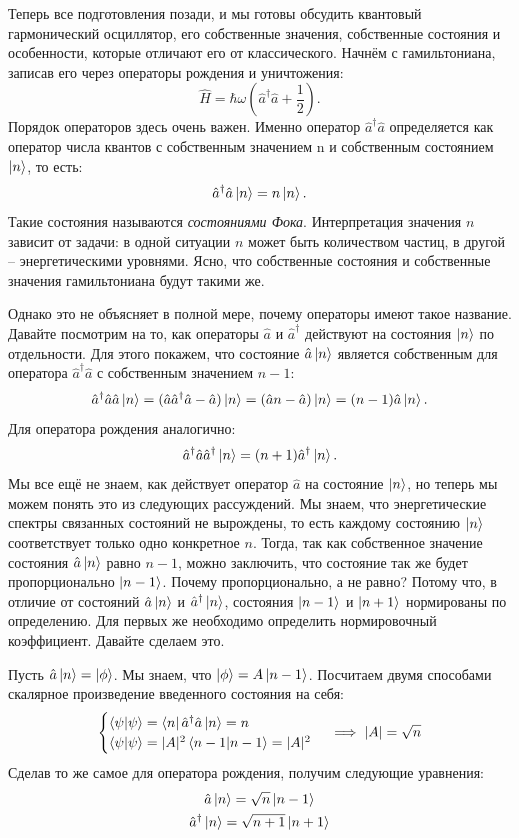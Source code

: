Теперь все подготовления позади, и мы готовы обсудить квантовый гармонический осциллятор, его собственные значения, собственные состояния и особенности, которые отличают его от классического. Начнём с гамильтониана, записав его через операторы рождения и уничтожения:
\[
\hat{H} = \hbar\omega\left( \hat{a}^{\dagger}\hat{a} + \frac{1}{2}\right).
\]
Порядок операторов здесь очень важен. Именно оператор $\hat{a}^{\dagger}\hat{a}$ определяется как оператор числа квантов с собственным значением n и собственным состоянием $\ket{n}$, то есть:
\[
\hat{a}^{\dagger}\hat{a}\ket{n} = n\ket{n}.
\] 
Такие состояния называются \textit{состояниями Фока}. Интерпретация значения $n$ зависит от задачи: в одной ситуации $n$ может быть количеством частиц, в другой -- энергетическими уровнями. Ясно, что собственные состояния и собственные значения гамильтониана будут такими же.

Однако это не объясняет в полной мере, почему операторы имеют такое название. Давайте посмотрим на то, как операторы $\hat{a}$ и $\hat{a}^{\dagger}$ действуют на состояния $\ket{n}$ по отдельности. Для этого покажем, что состояние $\hat{a}\ket{n}$ является собственным для оператора $\hat{a}^{\dagger}\hat{a}$ с собственным значением $n-1$:
\[
\hat{a}^{\dagger}\hat{a}\hat{a}\ket{n} = (\hat{a}\hat{a}^{\dagger}\hat{a} - \hat{a})\ket{n} = (\hat{a}n - \hat{a})\ket{n} = (n-1)\hat{a}\ket{n}.
\]
Для оператора рождения аналогично:
\[
\hat{a}^{\dagger}\hat{a}\hat{a}^{\dagger}\ket{n} = (n+1)\hat{a}^{\dagger}\ket{n}.
\]
Мы все ещё не знаем, как действует оператор $\hat{a}$ на состояние $\ket{n}$, но теперь мы можем понять это из следующих рассуждений. Мы знаем, что энергетические спектры связанных состояний не вырождены, то есть каждому состоянию $\ket{n}$ соответствует только одно конкретное $n$. Тогда, так как собственное значение состояния $\hat{a}\ket{n}$ равно $n-1$, можно заключить, что состояние так же будет пропорционально $\ket{n-1}$. Почему пропорционально, а не равно? Потому что, в отличие от состояний $\hat{a}\ket{n}$ и $\hat{a}^{\dagger}\ket{n}$, состояния $\ket{n-1}$ и $\ket{n+1}$ нормированы по определению. Для первых же необходимо определить нормировочный коэффициент. Давайте сделаем это.

Пусть $\hat{a}\ket{n} = \ket{\phi}$. Мы знаем, что $\ket{\phi} = A\ket{n-1}$. Посчитаем двумя способами скалярное произведение введенного состояния на себя:
\[
\begin{cases}
    \bra{\psi}\ket{\psi} = \bra{n}\hat{a}^{\dagger}\hat{a}\ket{n} = n\\
\bra{\psi}\ket{\psi} = |A|^2\bra{n-1}\ket{n-1} = |A|^2
\end{cases}
\implies |A| = \sqrt{n}
\]
Сделав то же самое для оператора рождения, получим следующие уравнения:
\begin{gather*}
\hat{a}\ket{n} = \sqrt{n}\ket{n-1}\\
\hat{a}^{\dagger}\ket{n} = \sqrt{n+1}\ket{n+1}
\end{gather*}

